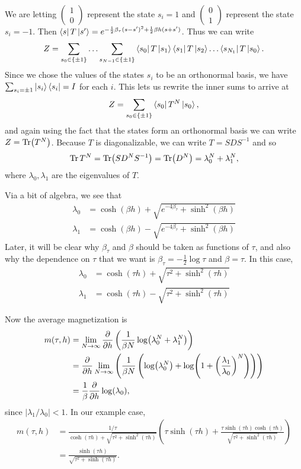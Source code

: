 \documentclass[11pt,reqno]{amsart}
\numberwithin{equation}{section}
\begin{document}
	We are letting $\begin{pmatrix}
	1 \\ 0 
	\end{pmatrix}$ represent the state $s_i=1$ and $\begin{pmatrix}
	0 \\ 1
	\end{pmatrix}$ represent the state $s_i=-1$. 
	Then $\bra{s}T\ket{s'}= e^{-\frac{1}{2}\beta_\tau(s-s')^2+\frac{1}{2}\beta h (s+s')}$.
	Thus we can write 
		\[Z=\sum_{s_0 \in \{\pm 1\}} \ldots \sum_{s_{N-1}\in \{\pm 1\}} \bra{s_0}T\ket{s_1}\bra{s_1}T\ket{s_2}\ldots\bra{s_{N_1}}T\ket{s_0}. \]
	Since we chose the values of the states $s_i$ to be an orthonormal basis, we have $\sum_{s_i=\pm 1} \ket{s_i}\bra{s_i}=I$ for each $i$.
	This lets us rewrite the inner sums to arrive at 
		 \[ Z=\sum_{s_0 \in \{\pm 1\}} \bra{s_0}T^N \ket{s_0}, \]
	and again using the fact that the states form an orthonormal basis we can write $Z=\Tr (T^N)$.
	Because $T$ is diagonalizable, we can write $T=SDS^{-1}$ and so 
		\[\Tr T^N=\Tr(SD^NS^{-1})=\Tr(D^N)=\lambda_0^N+\lambda_1^N,\]
	where $\lambda_0,\lambda_1$ are the eigenvalues of $T$.
	
	Via a bit of algebra, we see that 
	\begin{align*}
		\lambda_0 &=\cosh(\beta h)+ \sqrt{e^{-4\beta_\tau} +\sinh^2(\beta h) } \\
		\lambda_1 &=\cosh(\beta h)- \sqrt{e^{-4\beta_\tau} +\sinh^2(\beta h) }
	\end{align*} 
	Later, it will be clear why $\beta_\tau$ and $\beta$ should be taken as functions of $\tau$, and
	also why the dependence on $\tau$ that we want is $\beta_\tau=-\frac{1}{2}\log \tau$ and $\beta = \tau$.
	In this case,
	\begin{align*}
		\lambda_0 &=\cosh(\tau h)+ \sqrt{\tau^2 +\sinh^2(\tau h)} \\
		\lambda_1 &=\cosh(\tau h)- \sqrt{\tau^2 +\sinh^2(\tau h)}
	\end{align*}
	
	Now the average magnetization is
	\begin{align*}
		m(\tau, h)&=\lim_{N\to \infty}\frac{\partial}{\partial h}\left( \frac{1}{\beta N}\log(\lambda_0^N+\lambda_1^N) \right) \\
			&=\frac{\partial}{\partial h}\lim_{N\to \infty}\left( \frac{1}{\beta N}\left(\log(\lambda_0^N)+\log(1+\left(\frac{\lambda_1}{\lambda_0}\right)^N)\right) \right) \\
			&= \frac{1}{\beta}\frac{\partial}{\partial h} \log(\lambda_0),
	\end{align*}
	since $|\lambda_1/\lambda_0| <1.$
	In our example case,
	\begin{align*}
		m(\tau,h)&= \frac{1/\tau}{\cosh(\tau h)+ \sqrt{\tau^2 +\sinh^2(\tau h)}}\left( \tau \sinh(\tau h)+\frac{\tau \sinh(\tau h)\cosh(\tau h)}{\sqrt{\tau^2 +\sinh^2(\tau h)}} \right)\\
		&=\frac{\sinh(\tau h)}{\sqrt{\tau^2+\sinh(\tau h)}}.
	\end{align*}
\end{document}
